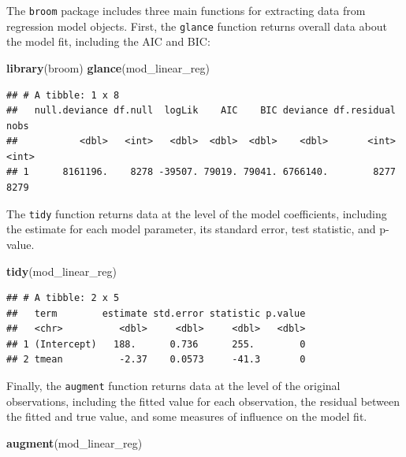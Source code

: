 \documentclass[
]{book}
\newenvironment{Shaded}{\begin{snugshade}}{\end{snugshade}}
\newcommand{\KeywordTok}[1]{\textcolor[rgb]{0.13,0.29,0.53}{\textbf{#1}}}
\newcommand{\NormalTok}[1]{#1}
\begin{document}
The \texttt{broom} package includes three main functions for extracting data from
regression model objects. First, the \texttt{glance} function returns overall data
about the model fit, including the AIC and BIC:

\begin{Shaded}
\begin{Highlighting}[]
\KeywordTok{library}\NormalTok{(broom)}
\KeywordTok{glance}\NormalTok{(mod_linear_reg)}
\end{Highlighting}
\end{Shaded}

\begin{verbatim}
## # A tibble: 1 x 8
##   null.deviance df.null  logLik    AIC    BIC deviance df.residual  nobs
##           <dbl>   <int>   <dbl>  <dbl>  <dbl>    <dbl>       <int> <int>
## 1      8161196.    8278 -39507. 79019. 79041. 6766140.        8277  8279
\end{verbatim}

The \texttt{tidy} function returns data at the level of the model coefficients,
including the estimate for each model parameter, its standard error, test
statistic, and p-value.

\begin{Shaded}
\begin{Highlighting}[]
\KeywordTok{tidy}\NormalTok{(mod_linear_reg)}
\end{Highlighting}
\end{Shaded}

\begin{verbatim}
## # A tibble: 2 x 5
##   term        estimate std.error statistic p.value
##   <chr>          <dbl>     <dbl>     <dbl>   <dbl>
## 1 (Intercept)   188.      0.736      255.        0
## 2 tmean          -2.37    0.0573     -41.3       0
\end{verbatim}

Finally, the \texttt{augment} function returns data at the level of the original
observations, including the fitted value for each observation, the residual
between the fitted and true value, and some measures of influence on the model
fit.

\begin{Shaded}
\begin{Highlighting}[]
\KeywordTok{augment}\NormalTok{(mod_linear_reg)}
\end{Highlighting}
\end{Shaded}
\end{document}
